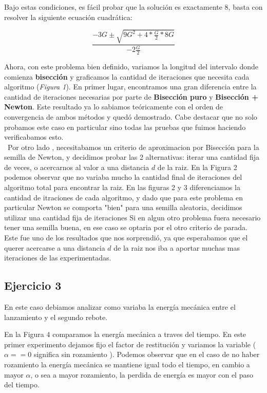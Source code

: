 \documentclass[a4paper]{article}
\begin{document}
Bajo estas condiciones, es fácil probar que la solución es exactamente 8, basta con resolver la siguiente ecuación cuadrática:

\begin{displaymath}
  \frac{-3G \pm \sqrt{9G^2 + 4*\frac{G}{2}*8G}}{-2\frac{G}{2}}
\end{displaymath}

Ahora, con este problema bien definido, variamos la longitud del intervalo donde comienza \textbf{bisección} y graficamos la cantidad de iteraciones que necesita cada algoritmo (\textit{Figura 1}).
En primer lugar, encontramos una gran diferencia entre la cantidad de iteraciones necesarias por parte de \textbf{Bisección puro} y \textbf{Bisección + Newton}. Este resultado ya lo sabiamos teóricamente con el orden de convergencia de ambos métodos y quedó demostrado. Cabe destacar que no solo probamos este caso en particular sino todas las pruebas que fuimos haciendo verificabamos esto.\\
 \ Por otro lado , necesitabamos un criterio de aproximacion por Bisección para la semilla de Newton, y decidimos probar las 2 alternativas: iterar una cantidad fija de veces, o acercarnos al valor a una distancia $d$ de la raiz.
En la Figura 2 podemos observar que no variaba mucho la cantidad final de iteraciones del algoritmo total para encontrar la raiz. En las figuras 2 y 3 diferenciamos la cantidad de itraciones de cada algoritmo, y dado que para este problema en particular Newton se comporta "bien" para una semilla aleatoria, decidimos utilizar una cantidad fija de iteraciones
Si en algun otro problema fuera necesario tener una semilla buena, en ese caso se optaria por el otro criterio de parada.
Este fue uno de los resultados que nos sorprendió, ya que esperabamos que el querer acercarse a una distancia $d$ de la raiz nos iba a aportar muchas mas iteraciones de las experimentadas.
 
 
 \subsection{Ejercicio 3}
	En este caso debiamos analizar como variaba la energía mecánica entre el lanzamiento y el segundo rebote.
	
	En la Figura 4 comparamos la energía mecánica a traves del tiempo. En este primer experimento dejamos fijo el factor de restitución y variamos la variable \alpha  ( $\alpha == 0$ significa sin rozamiento ). Podemos observar que en el caso de no haber rozamiento la energía mecánica se mantiene igual todo el tiempo, en cambio a mayor $\alpha$, o sea a mayor rozamiento, la perdida de energía es mayor con el paso del tiempo. \\
	
\end{document}
